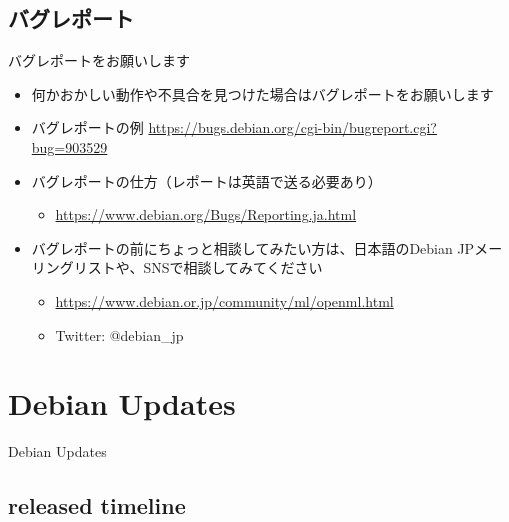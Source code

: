 \subsection{バグレポート}

\begin{frame}{バグレポートをお願いします}%
  \begin{itemize}
  \item 何かおかしい動作や不具合を見つけた場合はバグレポートをお願いします
  \item バグレポートの例 \url{https://bugs.debian.org/cgi-bin/bugreport.cgi?bug=903529}
  \item バグレポートの仕方（レポートは英語で送る必要あり）
    \begin{itemize}
    \item \url{https://www.debian.org/Bugs/Reporting.ja.html}
    \end{itemize}
  \item バグレポートの前にちょっと相談してみたい方は、日本語のDebian JPメーリングリストや、SNSで相談してみてください
    \begin{itemize}
    \item \url{https://www.debian.or.jp/community/ml/openml.html}
    \item Twitter: @debian\_jp
    \end{itemize}
  \end{itemize}
\end{frame}


\section{Debian Updates}


\begin{frame}
  \begin{center}\Huge{Debian Updates}\end{center}
\end{frame}


\subsection{released timeline}

